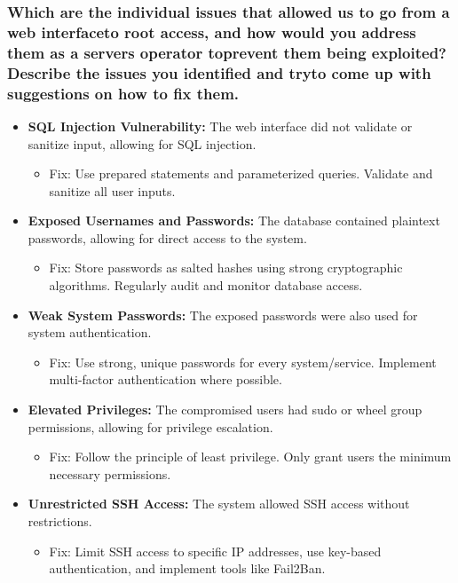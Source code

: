 \subsubsection{Which are the individual issues that allowed us to go from a web interfaceto root access, and how would you address them as a servers operator toprevent them being exploited? Describe the issues you identified and tryto come up with suggestions on how to fix them.}
\begin{itemize}
    \item \textbf{SQL Injection Vulnerability:}
          The web interface did not validate or sanitize input, allowing for SQL injection.
          \begin{itemize}
              \item Fix: Use prepared statements and parameterized queries. Validate and sanitize all user inputs.
          \end{itemize}

    \item \textbf{Exposed Usernames and Passwords:}
          The database contained plaintext passwords, allowing for direct access to the system.
          \begin{itemize}
              \item Fix: Store passwords as salted hashes using strong cryptographic algorithms. Regularly audit and monitor database access.
          \end{itemize}

    \item \textbf{Weak System Passwords:}
          The exposed passwords were also used for system authentication.
          \begin{itemize}
              \item Fix: Use strong, unique passwords for every system/service. Implement multi-factor authentication where possible.
          \end{itemize}

    \item \textbf{Elevated Privileges:}
          The compromised users had sudo or wheel group permissions, allowing for privilege escalation.
          \begin{itemize}
              \item Fix: Follow the principle of least privilege. Only grant users the minimum necessary permissions.
          \end{itemize}

    \item \textbf{Unrestricted SSH Access:}
          The system allowed SSH access without restrictions.
          \begin{itemize}
              \item Fix: Limit SSH access to specific IP addresses, use key-based authentication, and implement tools like Fail2Ban.
          \end{itemize}
\end{itemize}




